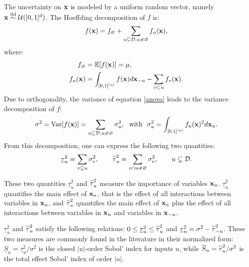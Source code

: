 The uncertainty on $\boldsymbol{\mathbf{x}}$ is modeled by a uniform random vector, namely $\boldsymbol{\mathbf{x}} \stackrel{{\rm iid}}{\sim} \mathcal{U}([0,1]^d)$. The Hoeffding decomposition \cite{Hoeffding,Sobol'} of $f$ is:
\begin{equation}
f(\boldsymbol{\mathbf{x}})=f_{\varnothing}+\sum \limits_{u \subseteq \mathcal{D}, u \neq \varnothing} f_u(\boldsymbol{\mathbf{x}}),
\label{anova}
\end{equation}
where:
\begin{align*}
f_{\varnothing} &= \mathbb{E}[f(\boldsymbol{\mathbf{x}})]= \mu, \\
f_u(\boldsymbol{\mathbf{x}}) &= \int_{[0,1]^{|u|}} f(\boldsymbol{\mathbf{x}}) d{\boldsymbol{\mathbf{x}}}_{-u} - \sum \limits_{v \subset u} f_v(\boldsymbol{\mathbf{x}}).
\end{align*}
Due to orthogonality, the variance of equation \eqref{anova} leads to the variance decomposition of $f$:
\[ \sigma^2 = \mathrm{Var}[f(\vx)] = \sum \limits_{u \subseteq \mathcal{D}, u \neq \varnothing} \sigma_u^2, \ \text{ with } \ \sigma_u^2=\int_{[0,1]^{|u|}} f_u(\vx)^2 d{\vx_u}.\]
From this decomposition, one can express the following two quantities:
\[\underline{\tau}_u^2 = \sum \limits_{v \subseteq u} \sigma_v^2, \qquad
\ov{$\tau$}_u^2 = \sum \limits_{v \cap u \neq \varnothing} \sigma_v^2, \qquad u \subsetneq \mathcal{D}.\]

These two quantities $\underline{\tau}_u^2$ and $\ov{$\tau$}_u^2$ measure the importance of variables $\boldsymbol{\mathbf{x}}_u$. $\underline{\tau}_u^2$ quantifies the main effect of $\boldsymbol{\mathbf{x}}_u$, that is the effect of all interactions between variables in $\boldsymbol{\mathbf{x}}_u$, and $\ov{$\tau$}_u^2$ quantifies the main effect of $\boldsymbol{\mathbf{x}}_u$ plus the effect of all interactions between variables in $\boldsymbol{\mathbf{x}}_u$ and variables in $\boldsymbol{\mathbf{x}}_{-u}$.

$\underline{\tau}_u^2$ and $\ov{$\tau$}_u^2$ satisfy the following relations: $ 0 \leq  \underline{\tau}_u^2 \leq \ov{$\tau$}_u^2$ and $\underline{\tau}_u^2 = \sigma^2 - \ov{$\tau$}_{-u}^2$. These two measures are commonly found in the literature in their normalized form: $\underline{S}_u = \underline{\tau}_u^2 / \sigma^2$ is the closed $|u|$-order Sobol' index for inputs $u$, while $\ov{$S$}_u = \ov{$\tau$}_u^2 / \sigma^2$ is the total effect Sobol' index of order $|u|$.
\bigskip

